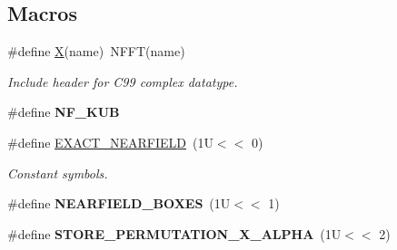 \subsection*{Macros}
\begin{DoxyCompactItemize}
\item 
\#define \hyperlink{group__applications__fastsum_ga826edd40636cbaa44266b97c8c6a4fa3}{X}(name)~N\-F\-F\-T(name)
\begin{DoxyCompactList}\small\item\em Include header for C99 complex datatype. \end{DoxyCompactList}\item 
\hypertarget{group__applications__fastsum_gafa2dd15778c93b2eaa42de608fb4d1a8}{\#define {\bfseries N\-F\-\_\-\-K\-U\-B}}\label{group__applications__fastsum_gafa2dd15778c93b2eaa42de608fb4d1a8}

\item 
\hypertarget{group__applications__fastsum_gac22376cb30edef9131c592a355d1030d}{\#define \hyperlink{group__applications__fastsum_gac22376cb30edef9131c592a355d1030d}{E\-X\-A\-C\-T\-\_\-\-N\-E\-A\-R\-F\-I\-E\-L\-D}~(1\-U$<$$<$ 0)}\label{group__applications__fastsum_gac22376cb30edef9131c592a355d1030d}

\begin{DoxyCompactList}\small\item\em Constant symbols. \end{DoxyCompactList}\item 
\hypertarget{group__applications__fastsum_ga90e3c393cc832eec83e9da3b207edb8c}{\#define {\bfseries N\-E\-A\-R\-F\-I\-E\-L\-D\-\_\-\-B\-O\-X\-E\-S}~(1\-U$<$$<$ 1)}\label{group__applications__fastsum_ga90e3c393cc832eec83e9da3b207edb8c}

\item 
\hypertarget{group__applications__fastsum_ga38b9b367d5183707d7485dd7efc6f435}{\#define {\bfseries S\-T\-O\-R\-E\-\_\-\-P\-E\-R\-M\-U\-T\-A\-T\-I\-O\-N\-\_\-\-X\-\_\-\-A\-L\-P\-H\-A}~(1\-U$<$$<$ 2)}\label{group__applications__fastsum_ga38b9b367d5183707d7485dd7efc6f435}

\end{DoxyCompactItemize}
